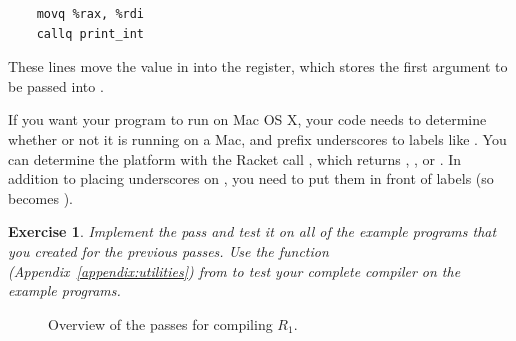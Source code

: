 \documentclass[11pt]{book}
\newtheorem{exercise}[theorem]{Exercise}
\begin{document}
\begin{lstlisting}
    movq %rax, %rdi
    callq print_int
\end{lstlisting}

These lines move the value in  into the  register, which
stores the first argument to be passed into .

If you want your program to run on Mac OS X, your code needs to
determine whether or not it is running on a Mac, and prefix
underscores to labels like .  You can determine the platform
with the Racket call , which returns
, , or .  In addition to
placing underscores on , you need to put them in front of
 labels (so  becomes ).

\begin{exercise}
\normalfont Implement the  pass and test it on all of
the example programs that you created for the previous passes. Use the
 function (Appendix~\ref{appendix:utilities}) from
 to test your complete compiler on the example
programs.
\end{exercise}

\begin{figure}[p]

\caption{Overview of the passes for compiling $R_1$. }
\label{fig:R1-passes}
\end{figure}
\end{document}
